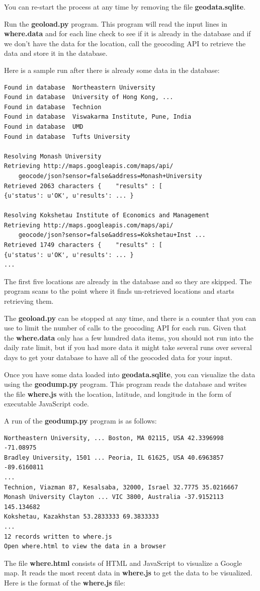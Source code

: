 \documentclass[11pt]{book}
\begin{document}
You can re-start the process at any time by removing the file
{\bf geodata.sqlite}.

Run the {\bf geoload.py} program.   This program will read the input
lines in {\bf where.data} and for each line check to see if it is already
in the database and if we don't have the data for the location,
call the geocoding API to retrieve the data and store it in 
the database.

Here is a sample run after there is already some data in the 
database:

\beforeverb
\begin{verbatim}
Found in database  Northeastern University
Found in database  University of Hong Kong, ...
Found in database  Technion
Found in database  Viswakarma Institute, Pune, India
Found in database  UMD
Found in database  Tufts University

Resolving Monash University
Retrieving http://maps.googleapis.com/maps/api/
    geocode/json?sensor=false&address=Monash+University
Retrieved 2063 characters {    "results" : [  
{u'status': u'OK', u'results': ... }

Resolving Kokshetau Institute of Economics and Management
Retrieving http://maps.googleapis.com/maps/api/
    geocode/json?sensor=false&address=Kokshetau+Inst ...
Retrieved 1749 characters {    "results" : [  
{u'status': u'OK', u'results': ... }
...
\end{verbatim}
\afterverb
%
The first five locations are already in the database and so they 
are skipped.  The program scans to the point where it finds un-retrieved
locations and starts retrieving them.

The {\bf geoload.py} can be stopped at any time, and there is a counter 
that you can use to limit the number of calls to the geocoding
API for each run.  Given that the {\bf where.data} only has a few hundred
data items, you should not run into the daily rate limit, but if you 
had more data it might take several runs over several days to 
get your database to have all of the geocoded data for your input.

Once you have some data loaded into {\bf geodata.sqlite}, you can 
visualize the data using the {\bf geodump.py} program.  This
program reads the database and writes the file {\bf where.js}
with the location, latitude, and longitude in the form of
executable JavaScript code.   

A run of the {\bf geodump.py} program is as follows:

\beforeverb
\begin{verbatim}
Northeastern University, ... Boston, MA 02115, USA 42.3396998 -71.08975
Bradley University, 1501 ... Peoria, IL 61625, USA 40.6963857 -89.6160811
...
Technion, Viazman 87, Kesalsaba, 32000, Israel 32.7775 35.0216667
Monash University Clayton ... VIC 3800, Australia -37.9152113 145.134682
Kokshetau, Kazakhstan 53.2833333 69.3833333
...
12 records written to where.js
Open where.html to view the data in a browser
\end{verbatim}
\afterverb
%
The file {\bf where.html} consists of HTML and JavaScript to visualize 
a Google map.  It reads the most recent data in {\bf where.js} to get 
the data to be visualized.  Here is the format of the {\bf where.js} file:
\end{document}
